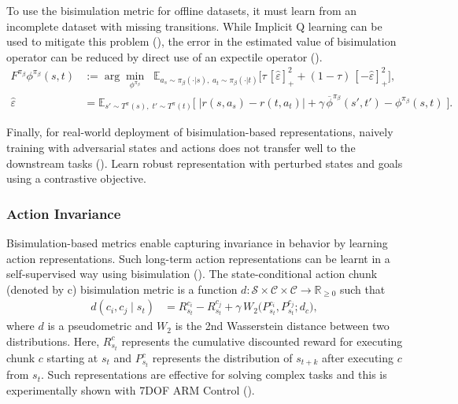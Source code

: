 \documentclass{article}
\begin{document}
To use the bisimulation metric for offline datasets, it must learn from an incomplete dataset with missing transitions. While Implicit Q learning can be used to mitigate this problem (\cite{hansen2022bisimulation}), the error in the estimated value of bisimulation operator can be reduced by direct use of an expectile operator (\cite{zang2023understanding}).
\begin{align}
F^{\pi_\beta} \phi^{\pi_\beta}(s, t) 
&:= \arg\min_{\phi^{\pi_\beta}} 
\;\; \mathbb{E}_{a_s \sim \pi_\beta(\cdot|s), \; a_t \sim \pi_\beta(\cdot|t)} \bigg[
    \tau \, [\hat{\varepsilon}]_+^2 
    + (1 - \tau) \, [-\hat{\varepsilon}]_+^2
\bigg], \label{eq:expectile_operator} \\
\hat{\varepsilon} 
&= \mathbb{E}_{s' \sim T^{\pi}(s), \; t' \sim T^{\pi}(t)} 
\Big[ \; \big| r(s,a_s) - r(t,a_t) \big| 
    + \gamma \, \overline{\phi}^{\pi_\beta}(s', t') 
    - \phi^{\pi_\beta}(s,t) \;\Big].
\label{eq:residual}
\end{align}

Finally, for real-world deployment of bisimulation-based representations, naively training with adversarial states and actions does not transfer well to the downstream tasks (\cite{yin2024representation}). Learn robust representation with perturbed states and goals using a contrastive objective. 

\subsubsection{Action Invariance} 
Bisimulation-based metrics enable capturing invariance in behavior by learning action representations. Such long-term action representations can be learnt in a self-supervised way using bisimulation (\cite{shi2024self}). The state-conditional action chunk (denoted by c) bisimulation metric is a function 
$d: \mathcal{S} \times \mathcal{C} \times \mathcal{C} \to \mathbb{R}_{\ge 0}$ such that
\begin{align}
d(c_i, c_j \mid s_t) 
&= R^{c_i}_{s_t} - R^{c_j}_{s_t} 
   + \gamma \, W_2 \big( P^{c_i}_{s_t}, P^{c_j}_{s_t}; d_{c} \big),
\label{eq:bisim_metric}
\end{align}
where $d$ is a pseudometric
and $W_2$ is the 2nd Wasserstein distance between two distributions.  
Here, $R^c_{s_t}$ represents the cumulative discounted reward for executing chunk $c$ starting at $s_t$ and 
$P^c_{s_t}$ represents the distribution of $s_{t+k}$ after executing $c$ from $s_t$.
Such representations are effective for solving complex tasks and this is experimentally shown with 7DOF ARM Control (\cite{shi2024self}).
\end{document}
